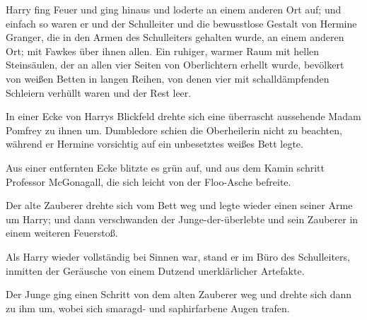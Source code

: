 Harry fing Feuer und ging hinaus und loderte an einem anderen Ort auf; und einfach so waren er und der Schulleiter und die bewusstlose Gestalt von Hermine Granger, die in den Armen des Schulleiters gehalten wurde, an einem anderen Ort; mit Fawkes über ihnen allen. Ein ruhiger, warmer Raum mit hellen Steinsäulen, der an allen vier Seiten von Oberlichtern erhellt wurde, bevölkert von weißen Betten in langen Reihen, von denen vier mit schalldämpfenden Schleiern verhüllt waren und der Rest leer.

In einer Ecke von Harrys Blickfeld drehte sich eine überrascht aussehende Madam Pomfrey zu ihnen um. Dumbledore schien die Oberheilerin nicht zu beachten, während er Hermine vorsichtig auf ein unbesetztes weißes Bett legte.

Aus einer entfernten Ecke blitzte es grün auf, und aus dem Kamin schritt Professor McGonagall, die sich leicht von der Floo-Asche befreite.

Der alte Zauberer drehte sich vom Bett weg und legte wieder einen seiner Arme um Harry; und dann verschwanden der Junge-der-überlebte und sein Zauberer in einem weiteren Feuerstoß.

\later

Als Harry wieder vollständig bei Sinnen war, stand er im Büro des Schulleiters, inmitten der Geräusche von einem Dutzend unerklärlicher Artefakte.

Der Junge ging einen Schritt von dem alten Zauberer weg und drehte sich dann zu ihm um, wobei sich smaragd- und saphirfarbene Augen trafen.

